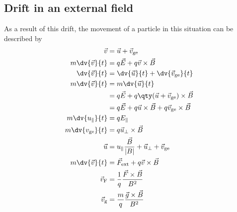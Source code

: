 \documentclass{book}         		                %
\begin{document}
\subsection{Drift in an external field}
\label{sec:drift-an-external}


As a result of this drift, the movement of a particle in this situation can be described by
\begin{align*}
  \label{eq:1}
  \vec{v} &= \vec{u} + \vec{v}_{\rm ge} \\
m \dv{\vec{v}}{t} &= q\vec{E} + q \vec{v} \times \vec{B} \\
\dv{\vec{v}}{t} &= \dv{\vec{u}}{t} + \dv{\vec{v}_{\rm ge}}{t} \\
m \dv{\vec{v}}{t} &= m \dv{\vec{u}}{t} \\ &= q \vec{E} + q \qty( \vec{u} + \vec{v}_{\rm ge}) \times \vec{B}\\
&= q \vec{E} + q \vec{u} \times \vec{B} + q \vec{v}_{\rm ge} \times \vec{B} \\
m \dv{u_{\parallel}}{t} &= q E_{\parallel} \\
m \dv{v_{\rm ge}}{t} &= q \vec{u}_{\perp} \times \vec{B} \\
\vec{u} &= u_{\parallel} \frac{\vec{B}}{|B|} + \vec{u}_{\perp} + \vec{v}_{\rm ge} \\
m \dv{\vec{v}}{t} &= \vec{F}_{\rm ext} + q \vec{v} \times \vec{B} \\
\vec{v}_{\rm F} &= \frac{1}{q} \frac{\vec{F} \times \vec{B}}{B^2} \\
\vec{v}_{\rm g} &= \frac{m}{q} \frac{\vec{g} \times \vec{B}}{B^2}
\end{align*}
\end{document}
